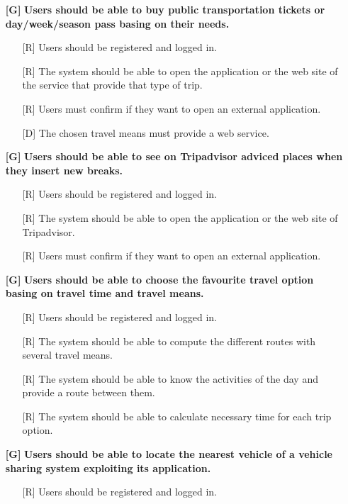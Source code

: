 \documentclass[12pt,titlepage]{article}
\begin{document}
\begin{itemize}
\item[\textbf{ {[G\ped{8}]}}]	\textbf{	Users should be able to buy public transportation tickets or day/week/season pass basing on their needs.}
\begin{itemize}
\item[{[R\ped{1}]}]  Users should be registered and logged in.
\item[{[R\ped{2}]}]  The system should be able to open the application or the web site of the service that provide that type of trip.
\item[{[R\ped{3}]}] Users must confirm if they want to open an external application.
\item[{[D\ped{1}]}]  The chosen travel means must provide a web service.
\end{itemize}
\item[\textbf{ {[G\ped{9}]}}]	\textbf{	Users should be able to see on Tripadvisor adviced places when they insert new breaks.}
\begin{itemize}
\item[{[R\ped{1}]}]  Users should be registered and logged in.
\item[{[R\ped{2}]}]  The system should be able to open the application or the web site of Tripadvisor.
\item[{[R\ped{3}]}] Users must confirm if they want to open an external application.
\end{itemize}
\item[\textbf{ {[G\ped{10}]}}]	\textbf{	Users should be able to choose the favourite travel option basing on travel time and travel means.}
\begin{itemize}
\item[{[R\ped{1}]}]  Users should be registered and logged in.
\item[{[R\ped{2}]}]  The system should be able to compute the different routes with several travel means.
\item[{[R\ped{3}]}] The system should be able to know the activities of the day and provide a route between them.
\item[{[R\ped{4}]}] The system should be able to calculate necessary time for each trip option.
\end{itemize}
\item[\textbf{ {[G\ped{11}]}}]	\textbf{	Users should be able to locate the nearest vehicle of a vehicle sharing system exploiting its application.}
\begin{itemize}
\item[{[R\ped{1}]}]  Users should be registered and logged in.

\end{itemize}
\end{itemize}
\end{document}
